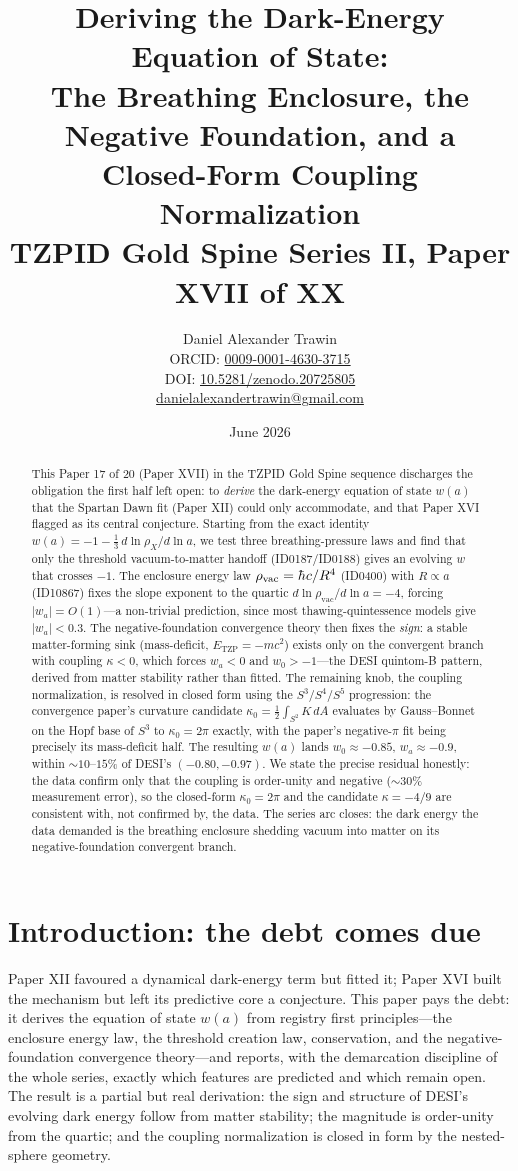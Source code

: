 \documentclass[11pt]{article}
\title{Deriving the Dark-Energy Equation of State:\\ The Breathing Enclosure, the Negative Foundation, and a Closed-Form Coupling Normalization\\[0.6em]
\large TZPID Gold Spine Series II, Paper XVII of XX}
\author{Daniel Alexander Trawin\\
\small ORCID: \href{https://orcid.org/0009-0001-4630-3715}{0009-0001-4630-3715}\\
\small DOI: \href{https://doi.org/10.5281/zenodo.20725805}{10.5281/zenodo.20725805}\\
\small \href{mailto:danielalexandertrawin@gmail.com}{danielalexandertrawin@gmail.com}}
\date{June 2026}
\theoremstyle{remark}
\newcommand{\hbb}{\ensuremath{\mathchar'26\mkern-9mu h}}
\begin{document}
\maketitle

\begin{abstract}
This Paper 17 of 20 (Paper XVII) in the TZPID Gold Spine sequence discharges the obligation the first half left open: to \emph{derive} the dark-energy equation of state $w(a)$ that the Spartan Dawn fit (Paper XII) could only accommodate, and that Paper XVI flagged as its central conjecture. Starting from the exact identity $w(a) = -1 - \tfrac{1}{3}\,d\ln\rho_X/d\ln a$, we test three breathing-pressure laws and find that only the threshold vacuum-to-matter handoff (ID0187/ID0188) gives an evolving $w$ that crosses $-1$. The enclosure energy law $\rho_{\mathrm{vac}} = \hbb c/R^4$ (ID0400) with $R \propto a$ (ID10867) fixes the slope exponent to the quartic $d\ln\rho_{\mathrm{vac}}/d\ln a = -4$, forcing $|w_a| = O(1)$---a non-trivial prediction, since most thawing-quintessence models give $|w_a| < 0.3$. The negative-foundation convergence theory then fixes the \emph{sign}: a stable matter-forming sink (mass-deficit, $E_{\mathrm{TZP}} = -mc^2$) exists only on the convergent branch with coupling $\kappa < 0$, which forces $w_a < 0$ and $w_0 > -1$---the DESI quintom-B pattern, derived from matter stability rather than fitted. The remaining knob, the coupling normalization, is resolved in closed form using the $S^3$/$S^4$/$S^5$ progression: the convergence paper's curvature candidate $\kappa_0 = \tfrac{1}{2}\int_{S^2}K\,dA$ evaluates by Gauss--Bonnet on the Hopf base of $S^3$ to $\kappa_0 = 2\pi$ exactly, with the paper's negative-$\pi$ fit being precisely its mass-deficit half. The resulting $w(a)$ lands $w_0 \approx -0.85$, $w_a \approx -0.9$, within $\sim 10$--$15\%$ of DESI's $(-0.80, -0.97)$. We state the precise residual honestly: the data confirm only that the coupling is order-unity and negative ($\sim 30\%$ measurement error), so the closed-form $\kappa_0 = 2\pi$ and the candidate $\kappa = -4/9$ are consistent with, not confirmed by, the data. The series arc closes: the dark energy the data demanded is the breathing enclosure shedding vacuum into matter on its negative-foundation convergent branch.
\end{abstract}

\section{Introduction: the debt comes due}
\label{sec:intro}
Paper XII favoured a dynamical dark-energy term but fitted it; Paper XVI built the mechanism but left its predictive core a conjecture. This paper pays the debt: it derives the equation of state $w(a)$ from registry first principles---the enclosure energy law, the threshold creation law, conservation, and the negative-foundation convergence theory---and reports, with the demarcation discipline of the whole series, exactly which features are predicted and which remain open. The result is a partial but real derivation: the sign and structure of DESI's evolving dark energy follow from matter stability; the magnitude is order-unity from the quartic; and the coupling normalization is closed in form by the nested-sphere geometry.
\end{document}
